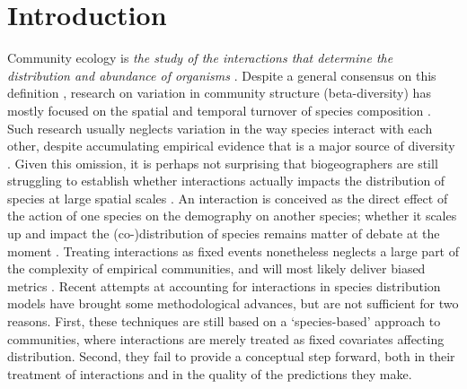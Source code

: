 \documentclass[12pt]{article}
\begin{document}
\newpage

\section*{Introduction}

Community ecology is \textit{the study of the interactions that determine the
distribution and abundance of organisms} \citep{Krebs2001}. Despite a general
consensus on this definition \citep{Scheiner2007a}, research on variation in
community structure (beta-diversity) has mostly focused on the spatial and
temporal turnover of species composition \citep{Anderson2011}. Such research
usually neglects variation in the way species interact with each other,
despite accumulating empirical evidence that is a major source of
diversity \citep{Poisot2015a}. Given this omission, it is perhaps not
surprising that biogeographers are still struggling to establish whether
interactions actually impacts the distribution of species at large spatial
scales \citep{Kissling2012}. An interaction is conceived as the direct effect
of the action of one species on the demography on another species; whether it
scales up and impact the (co-)distribution of species remains matter of debate
at the moment \citep{Wisz2012, GonzalezSalasar2013, Cazelles2016b,
Harris2016, Godsoe2017}. Treating interactions as fixed events nonetheless
neglects a large part of the complexity of empirical communities, and will
most likely deliver biased metrics \citep{Poisot2015c}. Recent attempts
at accounting for interactions in species distribution models
\citep{Pollock2014, Pelissier2013, Ovaskainen2017} have brought some
methodological advances, but are not sufficient for two reasons. First, these
techniques are still based on a `species-based' approach to communities, where
interactions are merely treated as fixed covariates affecting distribution.
Second, they fail to provide a conceptual step forward, both in their
treatment of interactions and in the quality of the predictions they make.
\end{document}
